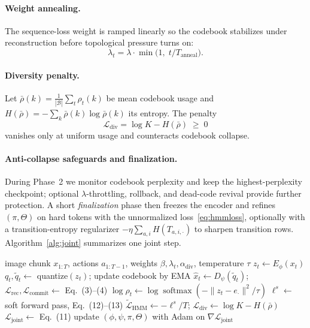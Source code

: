 \documentclass[twocolumn,10pt]{article}
\newcommand{\Lcal}{\mathcal{L}}
\begin{document}
\paragraph{Weight annealing.}
The sequence-loss weight is ramped linearly so the codebook stabilizes under
reconstruction before topological pressure turns on:
\begin{equation}
\lambda_t=\lambda\cdot\min\!\bigl(1,\;t/T_{\mathrm{anneal}}\bigr).
\end{equation}

\paragraph{Diversity penalty.}
Let $\bar\rho(k)=\frac{1}{|\mathcal{B}|}\sum_t\rho_t(k)$ be mean codebook
usage and $H(\bar\rho)=-\sum_k\bar\rho(k)\log\bar\rho(k)$ its entropy. The
penalty
\begin{equation}
\Lcal_{\mathrm{div}}=\log K-H(\bar\rho)\;\ge\;0
\end{equation}
vanishes only at uniform usage and counteracts codebook collapse.

\paragraph{Anti-collapse safeguards and finalization.}
During Phase~2 we monitor codebook perplexity and keep the
highest-perplexity checkpoint; optional $\lambda$-throttling, rollback, and
dead-code revival provide further protection. A short \emph{finalization}
phase then freezes the encoder and refines $(\pi,\Theta)$ on hard tokens with
the unnormalized loss~\eqref{eq:hmmloss}, optionally with a transition-entropy
regularizer $-\eta\sum_{a,i}H(T_{a,i,\cdot})$ to sharpen transition rows.
Algorithm~\ref{alg:joint} summarizes one joint step.

\begin{algorithm}[t]
\caption{One joint training step}
\label{alg:joint}
\begin{algorithmic}[1]
\Require image chunk $x_{1:T}$, actions $a_{1:T-1}$, weights
         $\beta,\lambda_t,\alpha_{\mathrm{div}}$, temperature $\tau$
\State $z_t \gets E_\phi(x_t)$ 
\State $q_t,\tilde q_t \gets$ quantize$(z_t)$; update codebook by EMA
\State $\hat x_t \gets D_\psi(\tilde q_t)$;\;
       $\Lcal_{\mathrm{rec}},\Lcal_{\mathrm{commit}}\gets$ Eq.~(3)--(4)
\State $\log\rho_t \gets \log\operatorname{softmax}(-\lVert z_t-e_\cdot
       \rVert^2/\tau)$
\State $\ell^{s}\gets$ soft forward pass, Eq.~(12)--(13)
\State $\widetilde{\Lcal}_{\mathrm{HMM}}\gets -\ell^{s}/T$;\;
       $\Lcal_{\mathrm{div}}\gets \log K-H(\bar\rho)$
\State $\Lcal_{\mathrm{joint}}\gets$ Eq.~(11)
\State update $(\phi,\psi,\pi,\Theta)$ with Adam on
       $\nabla\Lcal_{\mathrm{joint}}$
\end{algorithmic}
\end{algorithm}
\end{document}
